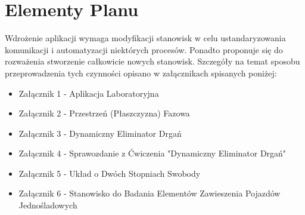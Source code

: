 \documentclass[12pt]{article}
\begin{document}
\section*{Elementy Planu}
Wdrożenie aplikacji wymaga modyfikacji stanowisk w celu ustandaryzowania komunikacji i automatyzacji niektórych procesów. Ponadto proponuje się do rozważenia stworzenie całkowicie nowych stanowisk. Szczegóły na temat sposobu przeprowadzenia tych czynności opisano w załącznikach spisanych poniżej:\\
\begin{itemize}
\item Załącznik 1 - Aplikacja Laboratoryjna
\item Załącznik 2 - Przestrzeń (Płaszczyzna) Fazowa
\item Załącznik 3 - Dynamiczny Eliminator Drgań
\item Załącznik 4 - Sprawozdanie z Ćwiczenia "Dynamiczny Eliminator Drgań"
\item Załącznik 5 - Układ o Dwóch Stopniach Swobody
\item Załącznik 6 - Stanowisko do Badania Elementów Zawieszenia Pojazdów Jednośladowych
\end{itemize}
\end{document}

